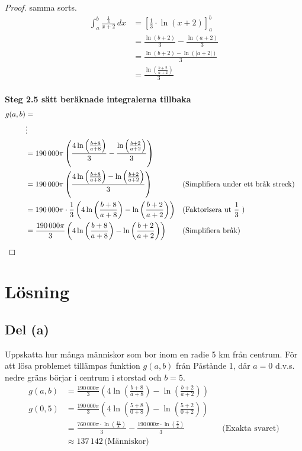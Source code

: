 \documentclass{article}
\begin{document}
\begin{proof}
samma sorts.
\begin{align*}
	\int_a^b \frac{\frac{1}{3}}{x + 2} \, dx 
	&= \left[\frac{1}{3} \cdot \ln{(x + 2)}\right]_a^b  \\
	&= \frac{\ln{(b + 2)}}{3} - \frac{\ln{(a + 2)}}{3} \\
	&= \frac{\ln{(b + 2)} - \ln{(|a + 2|)}}{3} \\
	&= \frac{\ln\left({\frac{{b + 2}}{{a + 2}}}\right)}{3} \\
\end{align*}

\textbf{Steg 2.5 sätt beräknade integralerna tillbaka}
\begin{align*}
	g(a,b) &= \\
	       &\vdots \\
	       &= 190\,000\pi \left( 
\frac{4\ln{\left(\frac{b + 8}{a + 8}\right)}}{3}
- \frac{\ln\left({\frac{{b + 2}}{{a + 2}}}\right)}{3}
	       \right) \\
	       &= 190\,000\pi \left( 
		       \frac{4\ln{\left(\frac{b + 8}{a + 8}\right)}
		       - \ln\left({\frac{b + 2}{a + 2}}\right)}
		       {3} 
	       \right) 
	       &&\text{(Simplifiera under ett bråk streck)} \\
	       &= 190\,000\pi \cdot
		       \frac{1}{3}  
	       \left( 
		       4\ln{\left(\frac{b + 8}{a + 8}\right)}
		       - \ln\left({\frac{b + 2}{a + 2}}\right)
	       \right)
	       &&\text{(Faktorisera ut \( \frac{1}{3} \) )} \\
	       &= \frac{190\,000\pi}
		       {3}  
	       \left( 
		       4\ln{\left(\frac{b + 8}{a + 8}\right)}
		       - \ln\left({\frac{b + 2}{a + 2}}\right)
	       \right)
	       &&\text{(Simplifiera bråk)} \\
\end{align*}
\end{proof}

\section*{Lösning}
\subsection*{Del (a)}
Uppskatta hur många människor som bor inom en radie 5 km från centrum.
För att lösa problemet tillämpas funktion \( g(a,b) \) från Påstånde 1, där \( a
= 0 \) d.v.s. nedre gräns börjar i centrum i storstad och \( b = 5 \).  
\begin{align*}
	g(a,b) &= \frac{190\,000 \pi}{3}
		\left(4\ln{\left(\frac{b + 8}{a + 8}\right)} 
		- \ln{\left(\frac{b + 2}{a + 2}\right)} \right)
		\\ 
	g(0,5) &= \frac{190\,000\pi}{3} \left(4\ln{\left(\frac{5 + 8}{0 + 8}\right)} 
		- \ln{\left(\frac{5 + 2}{0 + 2}\right)}\right) \\
	       &= \frac{760\,000\pi \cdot \ln{\left(\frac{13}{8}\right)}}{3} 
	       - \frac{190\,000\pi \cdot \ln{\left(\frac{7}{2}\right)}}{3} 
	       &&\text{(Exakta svaret)} \\
	       &\approx 137\,142 \, \text{(Människor)}
\end{align*}
\end{document}
